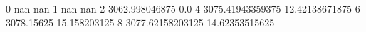 0 nan nan
1 nan nan
2 3062.998046875 0.0
4 3075.41943359375 12.42138671875
6 3078.15625 15.158203125
8 3077.62158203125 14.62353515625
